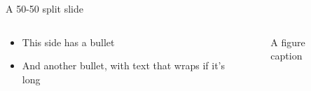 \documentclass[11pt,aspectratio=169]{beamer}
\begin{document}
\begin{frame}{A 50-50 split slide}

  \begin{columns}
    \begin{column}{0.5\linewidth}
      \begin{itemize}
        \item This side has a bullet
        \item And another bullet, with text that wraps if it's long
      \end{itemize}
    \end{column}
    \begin{column}{0.5\linewidth}
      \begin{figure}
        \centering
        \caption{A figure caption}
      \end{figure}
    \end{column}
  \end{columns}

\end{frame} 

\appendix
\end{document}
